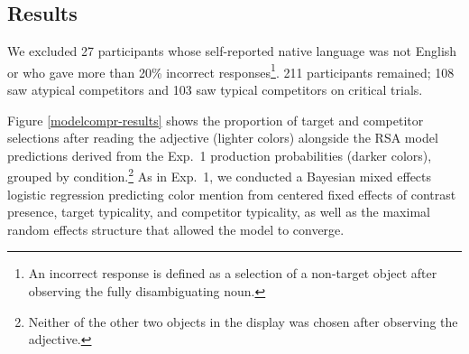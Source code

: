 \documentclass[10pt,letterpaper]{article}
\newcommand{\figref}[1]{Figure \ref{#1}}
\begin{document}

\subsection{Results}
We excluded 27 participants whose self-reported native language was not English or who gave more than 20\% incorrect responses\footnote{An incorrect response is defined as a selection of a non-target object after observing the fully disambiguating noun.}. 211 participants remained; 108 saw atypical competitors and 103 saw typical competitors on critical trials. 

\figref{modelcompr-results} shows the proportion of target and competitor selections after reading the adjective (lighter colors) alongside the RSA model predictions derived from the Exp.~1 production probabilities (darker colors), grouped by condition.\footnote{Neither of the other two objects in the display was chosen after observing the adjective.} %
As in Exp.~1, we conducted a Bayesian mixed effects logistic regression predicting color mention from centered fixed effects of contrast presence, target typicality, and competitor typicality, as well as the maximal random effects structure that allowed the model to converge.
\end{document}
